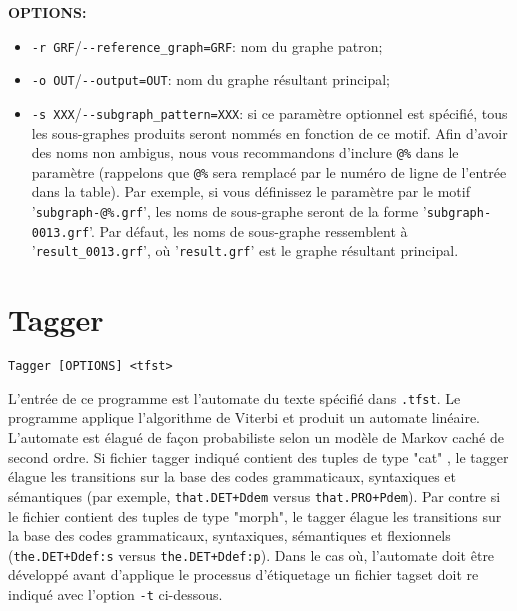 \bigskip
\noindent \textbf{OPTIONS:}
\begin{itemize}
\item \verb+-r GRF+/\verb+--reference_graph=GRF+: nom du graphe patron;
  
\item \verb+-o OUT+/\verb+--output=OUT+: nom du graphe résultant principal;
  
  \item \verb+-s XXX+/\verb+--subgraph_pattern=XXX+: si ce paramètre optionnel est spécifié, tous
  	  les sous-graphes produits seront nommés en fonction de ce motif. Afin d'avoir des noms non
  	  ambigus, nous vous recommandons d'inclure \verb+@%+ dans le paramètre
   (rappelons que \verb+@%+ sera remplacé par le numéro de ligne de l'entrée dans la table).
   Par exemple, si vous définissez le paramètre par le motif '\verb+subgraph-@%.grf+', 
   les noms de sous-graphe seront de la forme '\verb+subgraph-0013.grf+'. Par défaut,
   les noms de sous-graphe ressemblent à '\verb+result_0013.grf+', où '\verb+result.grf+' est le
   graphe résultant principal.
\end{itemize}




\section{Tagger}
\verb+Tagger [OPTIONS] <tfst>+
\label{section-Tagger}

\bigskip
\noindent L'entrée de ce programme est l'automate du texte spécifié dans \verb+.tfst+. Le programme
applique l'algorithme de Viterbi et produit un automate linéaire. L'automate est élagué de façon
probabiliste selon un modèle de Markov caché de second ordre. Si fichier tagger indiqué
contient des tuples de type "cat" , le tagger élague les transitions sur la base des codes grammaticaux, syntaxiques
et sémantiques (par exemple, \verb$that.DET+Ddem$ versus 
	\verb$that.PRO+Pdem$). Par contre si le fichier contient des tuples de type "morph", le tagger élague les transitions
sur la base des codes grammaticaux, syntaxiques, sémantiques et flexionnels (\verb$the.DET+Ddef:s$ versus \verb$the.DET+Ddef:p$). Dans le cas où,
l'automate doit être développé avant d'applique le processus d'étiquetage un fichier tagset doit re indiqué avec l'option \verb+-t+ ci-dessous.

